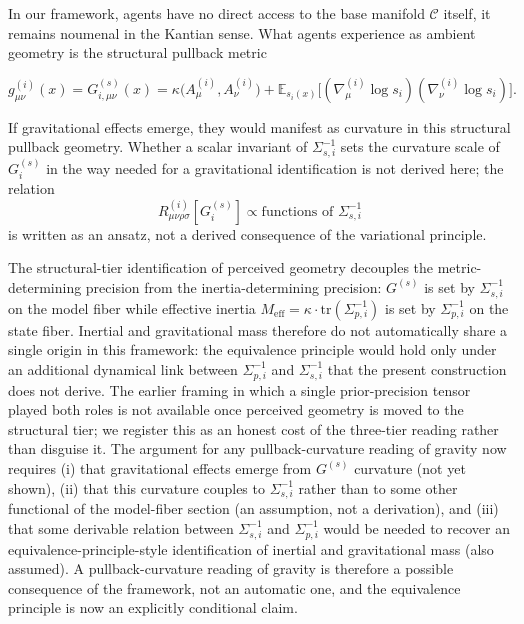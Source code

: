 \documentclass[11pt]{article}
\begin{document}
In our framework, agents have no direct access to the base manifold $\mathcal{C}$ itself, it remains noumenal in the Kantian sense. What agents experience as ambient geometry is the structural pullback metric

\begin{equation}
g_{\mu\nu}^{(i)}(x) = G^{(s)}_{i,\mu\nu}(x) = \kappa\big(A^{(i)}_\mu, A^{(i)}_\nu\big) + \mathbb{E}_{s_i(x)}\big[(\nabla^{(i)}_\mu \log s_i)(\nabla^{(i)}_\nu \log s_i)\big].
\end{equation}

If gravitational effects emerge, they would manifest as curvature in this structural pullback geometry. Whether a scalar invariant of $\Sigma_{s,i}^{-1}$ sets the curvature scale of $G^{(s)}_i$ in the way needed for a gravitational identification is not derived here; the relation
\begin{equation}
R_{\mu\nu\rho\sigma}^{(i)}[G^{(s)}_i] \propto \text{functions of } \Sigma_{s,i}^{-1}
\end{equation}
is written as an ansatz, not a derived consequence of the variational principle.

The structural-tier identification of perceived geometry decouples the metric-determining precision from the inertia-determining precision: $G^{(s)}$ is set by $\Sigma_{s,i}^{-1}$ on the model fiber while effective inertia $M_{\text{eff}} = \kappa \cdot \mathrm{tr}(\Sigma_{p,i}^{-1})$ is set by $\Sigma_{p,i}^{-1}$ on the state fiber. Inertial and gravitational mass therefore do not automatically share a single origin in this framework: the equivalence principle would hold only under an additional dynamical link between $\Sigma_{p,i}^{-1}$ and $\Sigma_{s,i}^{-1}$ that the present construction does not derive. The earlier framing in which a single prior-precision tensor played both roles is not available once perceived geometry is moved to the structural tier; we register this as an honest cost of the three-tier reading rather than disguise it. The argument for any pullback-curvature reading of gravity now requires (i) that gravitational effects emerge from $G^{(s)}$ curvature (not yet shown), (ii) that this curvature couples to $\Sigma_{s,i}^{-1}$ rather than to some other functional of the model-fiber section (an assumption, not a derivation), and (iii) that some derivable relation between $\Sigma_{s,i}^{-1}$ and $\Sigma_{p,i}^{-1}$ would be needed to recover an equivalence-principle-style identification of inertial and gravitational mass (also assumed). A pullback-curvature reading of gravity is therefore a possible consequence of the framework, not an automatic one, and the equivalence principle is now an explicitly conditional claim.
\end{document}
